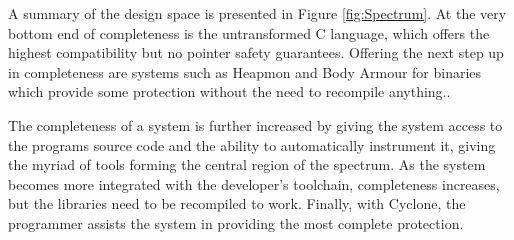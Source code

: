 A summary of the design space is presented in Figure \ref{fig:Spectrum}.
At the very bottom end of completeness is the untransformed C language, which offers the highest compatibility but no pointer safety guarantees.
Offering the next step up in completeness are systems such as Heapmon and Body Armour for binaries which provide some protection without the need to recompile anything..

The completeness of a system is further increased by giving the system access to the programs source code and the ability to automatically instrument it, giving the myriad of tools forming the central region of the spectrum.
As the system becomes more integrated with the developer's toolchain, completeness increases, but the libraries need to be recompiled to work.
Finally, with Cyclone, the programmer assists the system in providing the most complete protection.

